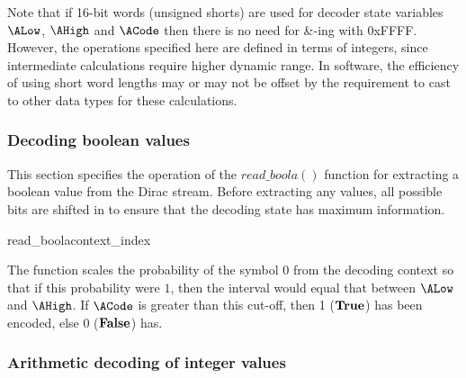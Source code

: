 \begin{informative}
Note that if 16-bit words (unsigned shorts) are used for decoder state variables $\ALow$,
 $\AHigh$ and $\ACode$ then there is no need for {\&}-ing with 0xFFFF. However, the 
operations specified here are defined in terms of integers, since intermediate calculations
 require higher dynamic range. In software, the efficiency of using short word lengths may
or may not be offset by the requirement to cast to other data types for these calculations.
\end{informative}

\subsubsection{Decoding boolean values}

\label{arithreadbool}

This section specifies the operation of the $read\_boola()$ function
for extracting a boolean value from the Dirac stream. Before extracting
any values, all possible bits are shifted in to ensure that the decoding
state has maximum information.

\begin{pseudo}{read\_boola}{context\_index}
\bsELSE
\bsEND
{}
\bsEND
{}
\end{pseudo}

\begin{informative}
The function scales the probability of the symbol $0$ from the decoding context
so that if this probability were $1$, then the interval would equal that between
 $\ALow$ and $\AHigh$. If $\ACode$ is greater than this cut-off, then 1 ($\text{\bf{True}}$) has
been encoded, else 0 ($\text{\bf{False}}$) has.
\end{informative}

\subsubsection{Arithmetic decoding of integer values}

